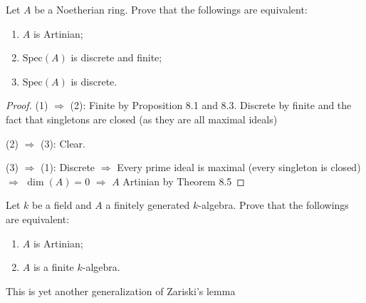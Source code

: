 \documentclass{solution}
\begin{document}
\begin{problem}
    Let $A$ be a Noetherian ring. Prove that the followings are equivalent:
    \begin{enumerate}
        \item $A$ is Artinian;
        \item $\mathrm{Spec}(A)$ is discrete and finite;
        \item $\mathrm{Spec}(A)$ is discrete.
    \end{enumerate}
\end{problem}

\begin{proof}
    (1) $\Rightarrow$ (2): Finite by Proposition 8.1 and 8.3. Discrete by finite and the fact that singletons are closed (as they are all maximal ideals)

    (2) $\Rightarrow$ (3): Clear.

    (3) $\Rightarrow$ (1): Discrete $\Rightarrow$ Every prime ideal is maximal (every singleton is closed) $\Rightarrow$ $\dim(A) = 0$ $\Rightarrow$ $A$ Artinian by Theorem 8.5
\end{proof}

\begin{problem}
    Let $k$ be a field and $A$ a finitely generated $k$-algebra. Prove that the followings are equivalent:
    \begin{enumerate}
        \item $A$ is Artinian;
        \item $A$ is a finite $k$-algebra.
    \end{enumerate}
\end{problem}

{\color{red} This is yet another generalization of Zariski's lemma}
\end{document}
